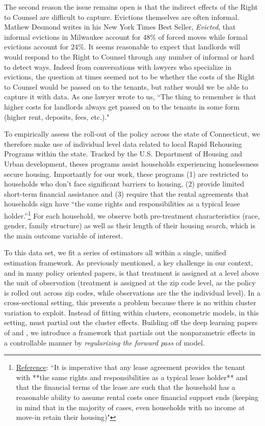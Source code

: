 \documentclass[a4paper,12pt]{article}
\begin{document}
The second reason the issue remains open is that the indirect effects of the Right to Counsel are difficult to capture. Evictions themselves are often informal. Mathew Desmond writes in his New York Times Best Seller, \textit{Evicted}, that informal evictions in Milwaukee account for $48\%$ of forced moves while formal evictions account for $24\%$. It seems reasonable to expect that landlords will would respond to the Right to Counsel through any number of informal or hard to detect ways. Indeed from conversations with lawyers who specialize in evictions, the question at times seemed not to be whether the costs of the Right to Counsel would be passed on to the tenants, but rather would we be able to capture it with data. As one lawyer wrote to us,  ``The thing to remember is that higher costs for landlords always get passed on to the tenants in some form (higher rent, deposits, fees, etc.)."\par 
To empirically assess the roll-out of the policy across the state of Connecticut, we therefore make use of individual level data related to local Rapid Rehousing Programs within the state. Tracked by the U.S. Department of Housing and Urban development, theses programs assist households experiencing homelessness secure housing. Importantly for our work, these programs (1) are restricted to households who don't face significant barriers to housing, (2) provide limited short-term financial assistance and (3) require that the rental agreements that households sign have ``the same rights and responsibilities as a typical lease holder.''\footnote{\href{thttps://endhomelessness.org/resource/rapid-re-housing-a-history-and-core-components/}{Reference}: ``It is imperative that any lease agreement provides the tenant with **the same rights and responsibilities as a typical lease holder** and that the financial terms of the lease are such that the household has a reasonable ability to assume rental costs once financial support ends (keeping in mind that in the majority of cases, even households with no income at move-in retain their housing)"} For each household, we observe both pre-treatment characteristics (race, gender, family structure) as well as their length of their housing search, which is the main outcome variable of interest. \par 
To this data set, we fit a series of estimators all within a single, unified estimation framework. As previously mentioned, a key challenge in our context, and in many policy oriented papers, is that treatment is assigned at a level above the unit of observation (treatment is assigned at the zip code level, as the policy is rolled out across zip codes, while observations are the the individual level). In a cross-sectional setting, this presents a problem because there is no within cluster variation to exploit. Instead of fitting within clusters, econometric models, in this setting, must partial out the cluster effects. Building off the deep learning papers of \cite{finn2017model} and \cite{kelly2020learning}, we introduce a framework that partials out the nonparametric effects in a controllable manner by \textit{regularizing the forward pass} of model. \par 
\end{document}
